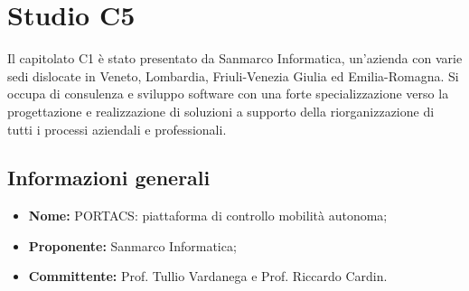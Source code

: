 \section{Studio C5} \label{_c5}
Il capitolato C1 è stato presentato da Sanmarco Informatica, un’azienda con varie sedi dislocate in Veneto, Lombardia, Friuli-Venezia Giulia ed Emilia-Romagna. Si occupa di consulenza e sviluppo software con una forte specializzazione verso la progettazione e realizzazione di soluzioni a supporto della riorganizzazione di tutti i processi aziendali e professionali.
\subsection{Informazioni generali}
\begin{itemize}
    \item \textbf{Nome:} PORTACS: piattaforma di controllo mobilità autonoma;
    \item \textbf{Proponente:} Sanmarco Informatica;
    \item \textbf{Committente:} Prof. Tullio Vardanega e Prof. Riccardo Cardin.
\end{itemize}

